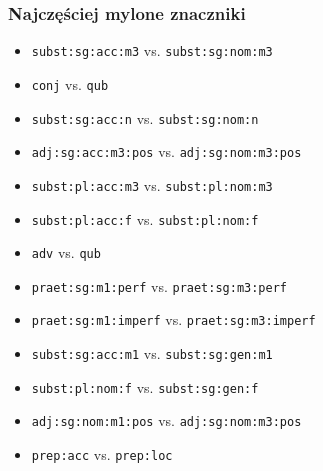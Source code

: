 \documentclass[xcolor=dvipsnames,polish]{beamer}
\begin{document}
\begin{frame}
  \frametitle{Najczęściej mylone znaczniki}
\begin{itemize}\small
\item\alert<2>{\texttt{subst:sg:acc:m3} vs. \texttt{subst:sg:nom:m3}}
\item \texttt{conj} vs. \texttt{qub}
\item \alert<2>{\texttt{subst:sg:acc:n} vs. \texttt{subst:sg:nom:n}}
\item \alert<4>{\texttt{adj:sg:acc:m3:pos} vs. \texttt{adj:sg:nom:m3:pos}}
\item \alert<2>{\texttt{subst:pl:acc:m3} vs. \texttt{subst:pl:nom:m3}}
\item \alert<2>{\texttt{subst:pl:acc:f} vs. \texttt{subst:pl:nom:f}}
\item \texttt{adv} vs. \texttt{qub}
\item \alert<3>{\texttt{praet:sg:m1:perf} vs. \texttt{praet:sg:m3:perf}}
\item \alert<3>{\texttt{praet:sg:m1:imperf} vs. \texttt{praet:sg:m3:imperf}}
\item \alert<2>{\texttt{subst:sg:acc:m1} vs. \texttt{subst:sg:gen:m1}}
\item \alert<2>{\texttt{subst:pl:nom:f} vs. \texttt{subst:sg:gen:f}}
\item \alert<4>{\texttt{adj:sg:nom:m1:pos} vs. \texttt{adj:sg:nom:m3:pos}}
\item  \texttt{prep:acc} vs. \texttt{prep:loc}

\end{itemize}
\end{frame}
\end{document}
